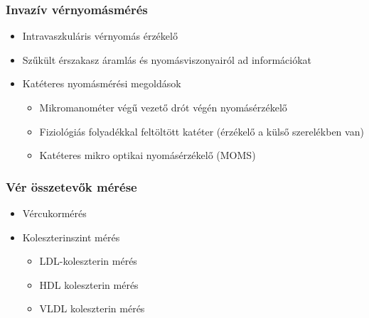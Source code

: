 \subsubsection{Invazív vérnyomásmérés}
\begin{itemize}
    \item Intravaszkuláris vérnyomás érzékelő
    \item Szűkült érszakasz áramlás és nyomásviszonyairól ad információkat
    \item Katéteres nyomásmérési megoldások
    \begin{itemize}
        \item Mikromanométer végű vezető drót végén nyomásérzékelő
        \item Fiziológiás folyadékkal feltöltött katéter (érzékelő a külső szerelékben van)        
        \item Katéteres mikro optikai nyomásérzékelő (MOMS)
    \end{itemize}
\end{itemize}

\subsubsection{Vér összetevők mérése}
\begin{itemize}
    \item Vércukormérés
    \item Koleszterinszint mérés
    \begin{itemize}
        \item LDL-koleszterin mérés
        \item HDL koleszterin mérés
        \item VLDL koleszterin mérés
    \end{itemize}
\end{itemize}

